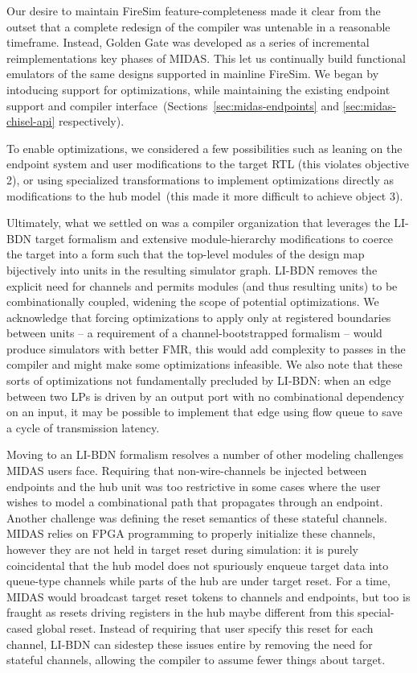 Our desire to maintain FireSim feature-completeness made it clear from the
outset that a complete redesign of the compiler was untenable in a reasonable timeframe. Instead, Golden
Gate was developed as a series of incremental reimplementations key phases of
MIDAS. This let us continually build functional emulators of the same designs
supported in mainline FireSim. We began by intoducing support for
optimizations, while maintaining the existing endpoint support and compiler
interface~(Sections~\ref{sec:midas-endpoints} and \ref{sec:midas-chisel-api}
respectively).

To enable optimizations, we considered a few possibilities such as leaning on
the endpoint system and user modifications to the target RTL (this violates
objective 2), or using specialized transformations to implement optimizations
directly as modifications to the hub model~(this made it more difficult to
achieve object 3).

Ultimately, what we settled on was a compiler organization that leverages the
LI-BDN target formalism and extensive module-hierarchy modifications to coerce
the target into a form such that the top-level modules of the design map
bijectively into units in the resulting simulator graph. LI-BDN removes the
explicit need for channels and permits modules (and thus resulting units) to be
combinationally coupled, widening the scope of potential optimizations. We
acknowledge that forcing optimizations to apply only at registered boundaries
between units -- a requirement of a channel-bootstrapped formalism -- would
produce simulators with better FMR, this would add complexity to passes in the
compiler and might make some optimizations infeasible.  We also note that these
sorts of optimizations not fundamentally precluded by LI-BDN: when an edge
between two LPs is driven by an output port with no combinational dependency on
an input, it may be possible to implement that edge using flow queue to save a
cycle of transmission latency.

Moving to an LI-BDN formalism resolves a number of other modeling
challenges MIDAS users face.  Requiring that non-wire-channels be injected
between endpoints and the hub unit was too restrictive in some cases where
the user wishes to model a combinational path that propagates through an
endpoint. Another challenge was defining the reset semantics of these
stateful channels.  MIDAS relies on FPGA programming to properly initialize
these channels, however they are not held in target reset  during
simulation: it is purely coincidental that the hub model does not
spuriously enqueue target data into queue-type channels while parts of the
hub are under target reset. For a time, MIDAS would broadcast target reset
tokens to channels and endpoints, but too is fraught as resets driving
registers in the hub maybe different from this special-cased global reset.
Instead of requiring that user specify this reset for each channel, LI-BDN
can sidestep these issues entire by removing the need for stateful
channels, allowing the compiler to assume fewer things about target.


